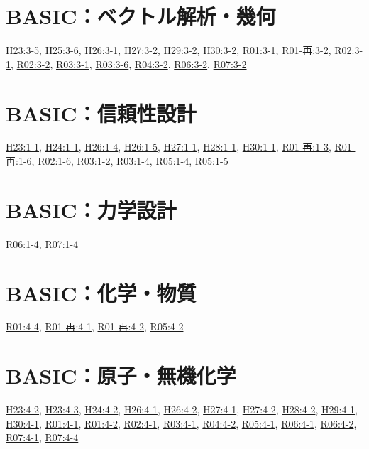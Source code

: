 \section{BASIC：ベクトル解析・幾何}
\hyperref[q:h23-reg-basic-3-5]{H23:3-5}, \hyperref[q:h25-reg-basic-3-6]{H25:3-6}, \hyperref[q:h26-reg-basic-3-1]{H26:3-1}, \hyperref[q:h27-reg-basic-3-2]{H27:3-2}, \hyperref[q:h29-reg-basic-3-2]{H29:3-2}, \hyperref[q:h30-reg-basic-3-2]{H30:3-2}, \hyperref[q:r01-reg-basic-3-1]{R01:3-1}, \hyperref[q:r01-ret-basic-3-2]{R01-再:3-2}, \hyperref[q:r02-reg-basic-3-1]{R02:3-1}, \hyperref[q:r02-reg-basic-3-2]{R02:3-2}, \hyperref[q:r03-reg-basic-3-1]{R03:3-1}, \hyperref[q:r03-reg-basic-3-6]{R03:3-6}, \hyperref[q:r04-reg-basic-3-2]{R04:3-2}, \hyperref[q:r06-reg-basic-3-2]{R06:3-2}, \hyperref[q:r07-reg-basic-3-2]{R07:3-2}
\section{BASIC：信頼性設計}
\hyperref[q:h23-reg-basic-1-1]{H23:1-1}, \hyperref[q:h24-reg-basic-1-1]{H24:1-1}, \hyperref[q:h26-reg-basic-1-4]{H26:1-4}, \hyperref[q:h26-reg-basic-1-5]{H26:1-5}, \hyperref[q:h27-reg-basic-1-1]{H27:1-1}, \hyperref[q:h28-reg-basic-1-1]{H28:1-1}, \hyperref[q:h30-reg-basic-1-1]{H30:1-1}, \hyperref[q:r01-ret-basic-1-3]{R01-再:1-3}, \hyperref[q:r01-ret-basic-1-6]{R01-再:1-6}, \hyperref[q:r02-reg-basic-1-6]{R02:1-6}, \hyperref[q:r03-reg-basic-1-2]{R03:1-2}, \hyperref[q:r03-reg-basic-1-4]{R03:1-4}, \hyperref[q:r05-reg-basic-1-4]{R05:1-4}, \hyperref[q:r05-reg-basic-1-5]{R05:1-5}
\section{BASIC：力学設計}
\hyperref[q:r06-reg-basic-1-4]{R06:1-4}, \hyperref[q:r07-reg-basic-1-4]{R07:1-4}
\section{BASIC：化学・物質}
\hyperref[q:r01-reg-basic-4-4]{R01:4-4}, \hyperref[q:r01-ret-basic-4-1]{R01-再:4-1}, \hyperref[q:r01-ret-basic-4-2]{R01-再:4-2}, \hyperref[q:r05-reg-basic-4-2]{R05:4-2}
\section{BASIC：原子・無機化学}
\hyperref[q:h23-reg-basic-4-2]{H23:4-2}, \hyperref[q:h23-reg-basic-4-3]{H23:4-3}, \hyperref[q:h24-reg-basic-4-2]{H24:4-2}, \hyperref[q:h26-reg-basic-4-1]{H26:4-1}, \hyperref[q:h26-reg-basic-4-2]{H26:4-2}, \hyperref[q:h27-reg-basic-4-1]{H27:4-1}, \hyperref[q:h27-reg-basic-4-2]{H27:4-2}, \hyperref[q:h28-reg-basic-4-2]{H28:4-2}, \hyperref[q:h29-reg-basic-4-1]{H29:4-1}, \hyperref[q:h30-reg-basic-4-1]{H30:4-1}, \hyperref[q:r01-reg-basic-4-1]{R01:4-1}, \hyperref[q:r01-reg-basic-4-2]{R01:4-2}, \hyperref[q:r02-reg-basic-4-1]{R02:4-1}, \hyperref[q:r03-reg-basic-4-1]{R03:4-1}, \hyperref[q:r04-reg-basic-4-2]{R04:4-2}, \hyperref[q:r05-reg-basic-4-1]{R05:4-1}, \hyperref[q:r06-reg-basic-4-1]{R06:4-1}, \hyperref[q:r06-reg-basic-4-2]{R06:4-2}, \hyperref[q:r07-reg-basic-4-1]{R07:4-1}, \hyperref[q:r07-reg-basic-4-4]{R07:4-4}
